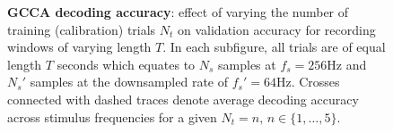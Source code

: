 \begin{figure}[htp]
\caption[\textbf{GCCA decoding accuracy}: effect of varying the number of training (calibration) trials $N_t$ on validation accuracy for recording windows of varying length $T$.]{\textbf{GCCA decoding accuracy}: effect of varying the number of training (calibration) trials $N_t$ on validation accuracy for recording windows of varying length $T$. In each subfigure, all trials are of equal length $T$ seconds which equates to $N_s$ samples at $f_s=256$Hz and $N_s'$ samples at the downsampled rate of $f_s'=64$Hz. Crosses connected with dashed traces denote average decoding accuracy across stimulus frequencies for a given $N_t=n, \, n\in\{1, \dots, 5\}$.}
\label{fig:gcca-acc-nt}
\end{figure}


\begin{figure}[htp]
\hfill
{}


\end{figure}
